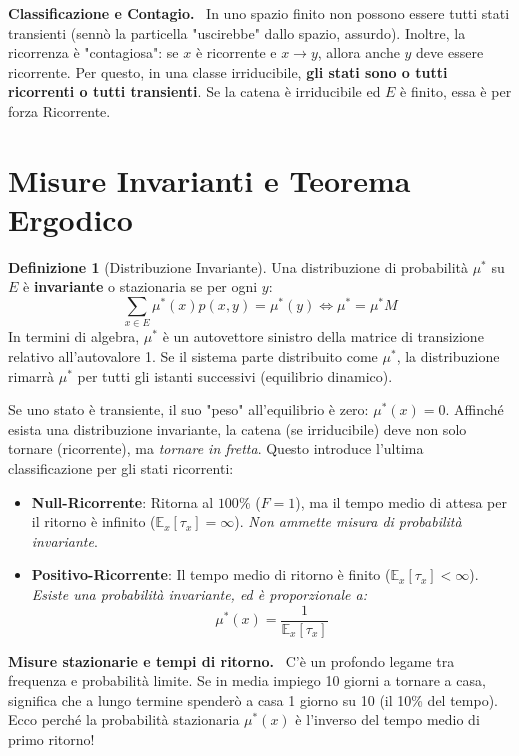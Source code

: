 \documentclass[11pt, a4paper]{report}
\theoremstyle{plain}
\theoremstyle{definition}
\newtheorem{definition}[theorem]{Definizione}
\theoremstyle{remark}
\newenvironment{hint}[1][Hint]
{\begin{mdframed}[backgroundcolor=blue!5, linecolor=blue!50, linewidth=2pt, topline=false, rightline=false, bottomline=false]
\textbf{\textsf{#1.}}\ }
{\end{mdframed}}
\newenvironment{spiegazione}[1][Spiegazione]
{\begin{mdframed}[backgroundcolor=green!5, linecolor=green!50, linewidth=2pt, topline=false, rightline=false, bottomline=false]
\textbf{\textsf{#1.}}\ }
{\end{mdframed}}
\newcommand{\E}{\mathbb{E}}
\newcommand{\1}{\mathbf{1}}
\begin{document}
\begin{hint}[Classificazione e Contagio]
In uno spazio finito non possono essere tutti stati transienti (sennò la particella "uscirebbe" dallo spazio, assurdo). 
Inoltre, la ricorrenza è "contagiosa": se $x$ è ricorrente e $x \to y$, allora anche $y$ deve essere ricorrente. Per questo, in una classe irriducibile, \textbf{gli stati sono o tutti ricorrenti o tutti transienti}. Se la catena è irriducibile ed $E$ è finito, essa è per forza Ricorrente.
\end{hint}

\section{Misure Invarianti e Teorema Ergodico}

\begin{definition}[Distribuzione Invariante]
Una distribuzione di probabilità $\mu^*$ su $E$ è \textbf{invariante} o stazionaria se per ogni $y$:
\[ \sum_{x \in E} \mu^*(x) p(x,y) = \mu^*(y) \iff \mu^* = \mu^* M \]
In termini di algebra, $\mu^*$ è un autovettore sinistro della matrice di transizione relativo all'autovalore 1. Se il sistema parte distribuito come $\mu^*$, la distribuzione rimarrà $\mu^*$ per tutti gli istanti successivi (equilibrio dinamico).
\end{definition}

Se uno stato è transiente, il suo "peso" all'equilibrio è zero: $\mu^*(x) = 0$.
Affinché esista una distribuzione invariante, la catena (se irriducibile) deve non solo tornare (ricorrente), ma \emph{tornare in fretta}. Questo introduce l'ultima classificazione per gli stati ricorrenti:

\begin{itemize}
    \item \textbf{Null-Ricorrente}: Ritorna al $100\%$ ($F=1$), ma il tempo medio di attesa per il ritorno è infinito ($\E_x[\tau_x] = \infty$). \emph{Non ammette misura di probabilità invariante}.
    \item \textbf{Positivo-Ricorrente}: Il tempo medio di ritorno è finito ($\E_x[\tau_x] < \infty$). \emph{Esiste una probabilità invariante, ed è proporzionale a:}
    \[ \mu^*(x) = \frac{1}{\E_x[\tau_x]} \]
\end{itemize}

\begin{spiegazione}[Misure stazionarie e tempi di ritorno]
C'è un profondo legame tra frequenza e probabilità limite. Se in media impiego 10 giorni a tornare a casa, significa che a lungo termine spenderò a casa 1 giorno su 10 (il 10\% del tempo). Ecco perché la probabilità stazionaria $\mu^*(x)$ è l'inverso del tempo medio di primo ritorno!
\end{spiegazione}
\end{document}
